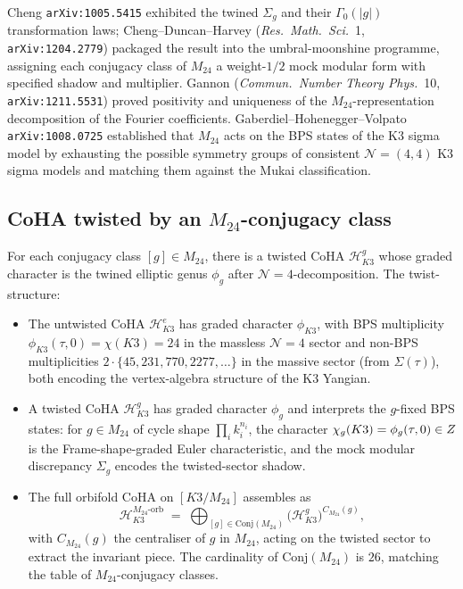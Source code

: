 Cheng \texttt{arXiv:1005.5415} exhibited the twined $\Sigma_g$ and their $\Gamma_0(|g|)$ transformation laws; Cheng--Duncan--Harvey (\emph{Res.\ Math.\ Sci.}\ 1, \texttt{arXiv:1204.2779}) packaged the result into the umbral-moonshine programme, assigning each conjugacy class of $M_{24}$ a weight-$1/2$ mock modular form with specified shadow and multiplier. Gannon (\emph{Commun.\ Number Theory Phys.}\ 10, \texttt{arXiv:1211.5531}) proved positivity and uniqueness of the $M_{24}$-representation decomposition of the Fourier coefficients. Gaberdiel--Hohenegger--Volpato \texttt{arXiv:1008.0725} established that $M_{24}$ acts on the BPS states of the K3 sigma model by exhausting the possible symmetry groups of consistent $\mathcal{N} = (4, 4)$ K3 sigma models and matching them against the Mukai classification.

\subsection{CoHA twisted by an \texorpdfstring{$M_{24}$}{M24}-conjugacy class}
\label{subsec:coha-m24-twist}

For each conjugacy class $[g] \in M_{24}$, there is a twisted CoHA $\mathcal{H}_{K3}^g$ whose graded character is the twined elliptic genus $\phi_g$ after $\mathcal{N}=4$-decomposition. The twist-structure:
\begin{itemize}
  \item The untwisted CoHA $\mathcal{H}_{K3}^e$ has graded character $\phi_{K3}$, with BPS multiplicity $\phi_{K3}(\tau, 0) = \chi(K3) = 24$ in the massless $\mathcal{N} = 4$ sector and non-BPS multiplicities $2 \cdot \{45, 231, 770, 2277, \ldots\}$ in the massive sector (from $\Sigma(\tau)$), both encoding the vertex-algebra structure of the K3 Yangian.
  \item A twisted CoHA $\mathcal{H}_{K3}^g$ has graded character $\phi_g$ and interprets the $g$-fixed BPS states: for $g \in M_{24}$ of cycle shape $\prod_i k_i^{n_i}$, the character $\chi_g(K3) = \phi_g(\tau, 0) \in Z$ is the Frame-shape-graded Euler characteristic, and the mock modular discrepancy $\Sigma_g$ encodes the twisted-sector shadow.
  \item The full orbifold CoHA on $[K3 / M_{24}]$ assembles as
  \[
  \mathcal{H}_{K3}^{M_{24}\text{-orb}} \;=\; \bigoplus_{[g] \in \mathrm{Conj}(M_{24})} \bigl(\mathcal{H}_{K3}^g\bigr)^{C_{M_{24}}(g)},
  \]
  with $C_{M_{24}}(g)$ the centraliser of $g$ in $M_{24}$, acting on the twisted sector to extract the invariant piece. The cardinality of $\mathrm{Conj}(M_{24})$ is $26$, matching the table of $M_{24}$-conjugacy classes.
\end{itemize}

